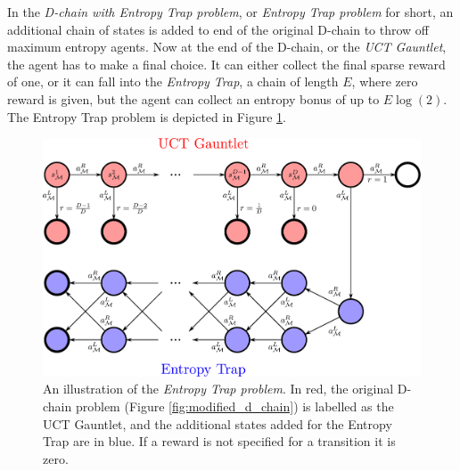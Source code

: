         In the \textit{D-chain with Entropy Trap problem}, or \textit{Entropy Trap problem} for short, an additional chain of states is added to end of the original D-chain to throw off maximum entropy agents. Now at the end of the D-chain, or the \textit{UCT Gauntlet}, the agent has to make a final choice. It can either collect the final sparse reward of one, or it can fall into the \textit{Entropy Trap}, a chain of length $E$, where zero reward is given, but the agent can collect an entropy bonus of up to $E\log(2)$. The Entropy Trap problem is depicted in Figure \ref{fig:entropy_trap}. 


        \begin{figure}
            \centering
            \includegraphics[width=\textwidth]{figures/ch4/entropy_trap_mdp_colour.pdf}
            \caption[An illustration of the \textit{Entropy Trap problem}.]{An illustration of the \textit{Entropy Trap problem}. In red, the original D-chain problem (Figure \ref{fig:modified_d_chain}) is labelled as the UCT Gauntlet, and the additional states added for the Entropy Trap are in blue. If a reward is not specified for a transition it is zero.}
            \label{fig:entropy_trap}
        \end{figure}

